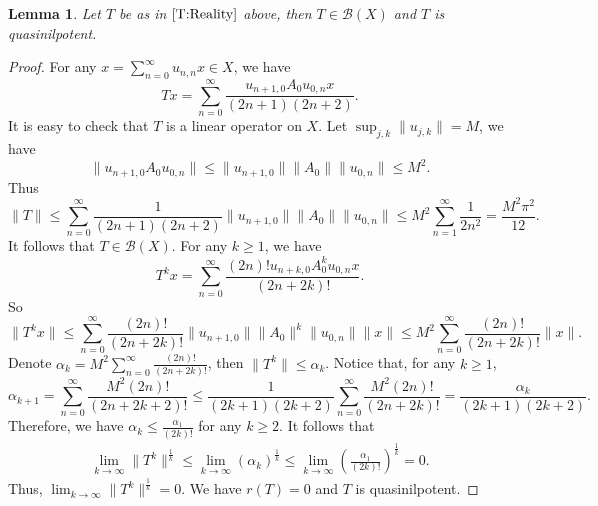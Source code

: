 \documentclass[12pt]{amsart}
\numberwithin{equation}{section}
\theoremstyle{plain}
\newtheorem{lem}[thm]{Lemma}
\theoremstyle{definition}
\newcommand{\B}{{\mathcal{B}}}
\begin{document}
\begin{lem}\label{T:quani}
Let $T$ be as in $\eqref{T:Reality}$ above, then $T\in\B(X)$ and $T$ is quasinilpotent.
\end{lem}
\begin{proof}
For any $x=\sum_{n=0}^{\infty}u_{n,n}x\in X$, we have
$$Tx=\sum\limits_{n=0}^{\infty}\frac{u_{n+1,0} A_0 u_{0,n}x}{(2n+1)(2n+2)}.$$
It is easy to check that $T$ is a linear operator on $X$.
Let $\sup_{j,k}\|u_{j,k}\|=M$, we have
$$\|u_{n+1, 0} A_0 u_{0,n}\|\leq\|u_{n+1, 0}\|\|A_0\|\|u_{0,n}\|\leq M^2.$$
Thus
\begin{equation*}
\|T\|\leq \sum\limits_{n=0}^{\infty}\frac{1}{(2n+1)(2n+2)}
\|u_{n+1, 0}\|\|A_0\|\|u_{0,n}\|
\leq M^2\sum\limits_{n=1}^{\infty}\frac{1}{2 n^2}=\frac{M^2\pi^2}{12}.
\end{equation*}
It follows that $T\in\B(X)$.
For any $k\geq 1$, we have
$$T^k x=\sum\limits_{n=0}^{\infty}\frac{(2n)!u_{n+k, 0}A_0^k u_{0,n}x}{(2n+2k)!}.$$
So
$$\|T^k x\|\leq \sum\limits_{n=0}^{\infty}\frac{(2n)!}{(2n+2k)!}\|u_{n+1, 0}\|\|A_0\|^k\|u_{0,n}\|\|x\|\leq M^2\sum\limits_{n=0}^{\infty}\frac{(2n)!}{(2n+2k)!}\|x\|.$$
Denote
$\alpha_k=M^2\sum_{n=0}^{\infty}\frac{(2n)!}{(2n+2k)!}$, then $\|T^k\|\leq \alpha_k$.
Notice that, for any $k\geq 1$,
$$\alpha_{k+1}=\sum\limits_{n=0}^{\infty}\frac{M^{2}(2n)!}{(2n+2k+2)!}
\leq \frac{1}{(2k+1)(2k+2)}\sum\limits_{n=0}^{\infty}\frac{M^{2}(2n)!}{(2n+2k)!}
= \frac{\alpha_{k}}{(2k+1)(2k+2)}.$$
Therefore, we have $\alpha_k\leq \frac{\alpha_1}{(2k)!}$ for any $k\geq 2$.
It follows that
\begin{align*}
\lim\limits_{k\rightarrow\infty}\|T^k\|^{\frac{1}{k}}
\leq\lim\limits_{k\rightarrow\infty}(\alpha_{k})^{\frac{1}{k}}
\leq\lim\limits_{k\rightarrow\infty}\left(\frac{\alpha_1}{(2k)!}\right)^{\frac{1}{k}}=0.
\end{align*}
Thus, $\lim_{k\rightarrow\infty}\|T^k\|^{\frac{1}{k}}=0$.
We have $r(T)=0$ and $T$ is quasinilpotent.
\end{proof}
\end{document}
